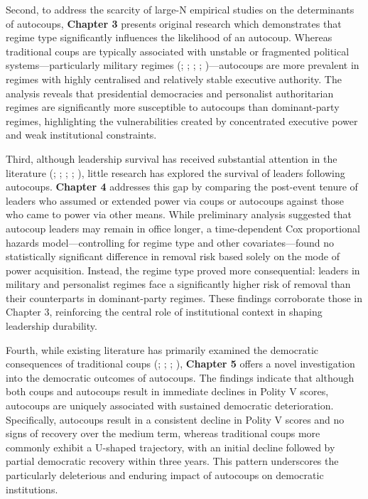 \documentclass[
  12pt,
]{report}
\begin{document}
Second, to address the scarcity of large-N empirical studies on the
determinants of autocoups, \textbf{Chapter 3} presents original research
which demonstrates that regime type significantly influences the
likelihood of an autocoup. Whereas traditional coups are typically
associated with unstable or fragmented political systems---particularly
military regimes (;
;
;
;
)---autocoups are more
prevalent in regimes with highly centralised and relatively stable
executive authority. The analysis reveals that presidential democracies
and personalist authoritarian regimes are significantly more susceptible
to autocoups than dominant-party regimes, highlighting the
vulnerabilities created by concentrated executive power and weak
institutional constraints.

Third, although leadership survival has received substantial attention
in the literature (; ;
;
;
), little research has explored the survival of leaders following
autocoups. \textbf{Chapter 4} addresses this gap by comparing the
post-event tenure of leaders who assumed or extended power via coups or
autocoups against those who came to power via other means. While
preliminary analysis suggested that autocoup leaders may remain in
office longer, a time-dependent Cox proportional hazards
model---controlling for regime type and other covariates---found no
statistically significant difference in removal risk based solely on the
mode of power acquisition. Instead, the regime type proved more
consequential: leaders in military and personalist regimes face a
significantly higher risk of removal than their counterparts in
dominant-party regimes. These findings corroborate those in Chapter 3,
reinforcing the central role of institutional context in shaping
leadership durability.

Fourth, while existing literature has primarily examined the democratic
consequences of traditional coups (; ; ;
), \textbf{Chapter 5}
offers a novel investigation into the democratic outcomes of autocoups.
The findings indicate that although both coups and autocoups result in
immediate declines in Polity V scores, autocoups are uniquely associated
with sustained democratic deterioration. Specifically, autocoups result
in a consistent decline in Polity V scores and no signs of recovery over
the medium term, whereas traditional coups more commonly exhibit a
U-shaped trajectory, with an initial decline followed by partial
democratic recovery within three years. This pattern underscores the
particularly deleterious and enduring impact of autocoups on democratic
institutions.
\end{document}
